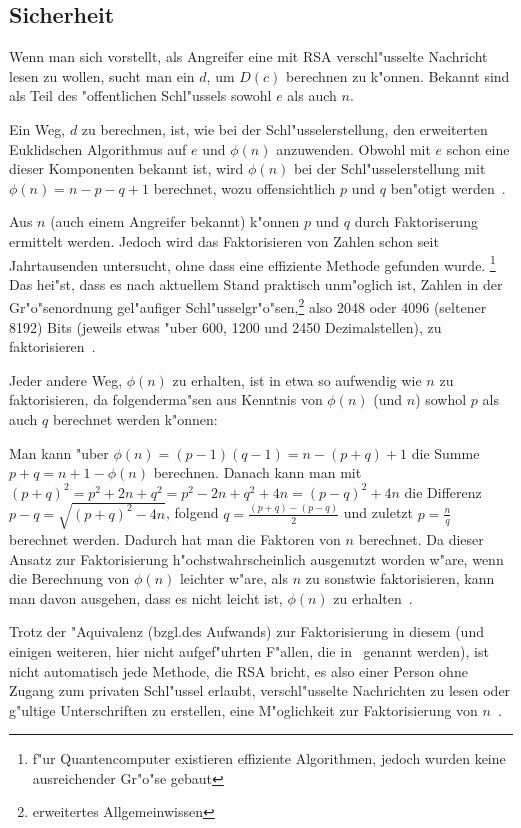 \documentclass[12pt]{article}
\begin{document}
\subsection{Sicherheit}
\label{subsec:math:security}

Wenn man sich vorstellt, als Angreifer eine mit RSA verschl"usselte Nachricht
lesen zu wollen, sucht man ein $d$, um $D(c)$ berechnen zu k"onnen.
Bekannt sind als Teil des "offentlichen Schl"ussels sowohl $e$ als auch $n$.

Ein Weg, $d$ zu berechnen, ist, wie bei der Schl"usselerstellung,
den erweiterten Euklidschen Algorithmus auf $e$ und $\phi(n)$ anzuwenden.
Obwohl mit $e$ schon eine dieser Komponenten bekannt ist, wird $\phi(n)$
bei der Schl"usselerstellung mit $\phi(n) = n - p - q + 1$ berechnet,
wozu offensichtlich $p$ und $q$ ben"otigt werden~\cite{rsa}.

Aus $n$ (auch einem Angreifer bekannt) k"onnen $p$ und $q$ durch Faktoriserung ermittelt werden.
Jedoch wird das Faktorisieren von Zahlen schon seit Jahrtausenden untersucht,
ohne dass eine effiziente Methode gefunden wurde.%
\footnote{f"ur Quantencomputer existieren effiziente Algorithmen,
jedoch wurden keine ausreichender Gr"o"se gebaut}
Das hei"st, dass es nach aktuellem Stand praktisch unm"oglich ist,
Zahlen in der Gr"o"senordnung gel"aufiger Schl"usselgr"o"sen,\footnote{erweitertes Allgemeinwissen}
also 2048 oder 4096 (seltener 8192) Bits (jeweils etwas "uber 600, 1200 und 2450 Dezimalstellen),
zu faktorisieren~\cite{sinews}.

Jeder andere Weg, $\phi(n)$ zu erhalten, ist in etwa so aufwendig wie $n$ zu faktorisieren,
da folgenderma"sen aus Kenntnis von $\phi(n)$ (und $n$) sowhol $p$ als auch $q$ berechnet werden k"onnen:

Man kann "uber $\phi(n) = (p-1)(q-1) = n - (p+q) + 1$ die Summe $p+q = n + 1 - \phi(n)$ berechnen.
Danach kann man mit $(p+q)^2 = p^2 + 2n + q^2 = p^2 - 2n + q^2 + 4n = (p-q)^2 + 4n$
die Differenz $p-q = \sqrt{(p+q)^2 - 4n}$, folgend $q = \frac{(p+q) - (p-q)}{2}$
und zuletzt $p = \frac{n}{q}$ berechnet werden.
Dadurch hat man die Faktoren von $n$ berechnet.
Da dieser Ansatz zur Faktorisierung h"ochstwahrscheinlich ausgenutzt worden w"are,
wenn die Berechnung von $\phi(n)$ leichter w"are, als $n$ zu sonstwie faktorisieren,
kann man davon ausgehen, dass es nicht leicht ist, $\phi(n)$ zu erhalten~\cite{rsa}.

Trotz der "Aquivalenz (bzgl.\@ des Aufwands) zur Faktorisierung in diesem (und einigen weiteren,
hier nicht aufgef"uhrten F"allen, die in~\cite{rsa} genannt werden),
ist nicht automatisch jede Methode, die RSA bricht,
es also einer Person ohne Zugang zum privaten Schl"ussel erlaubt,
verschl"usselte Nachrichten zu lesen oder g"ultige Unterschriften zu erstellen,
eine M"oglichkeit zur Faktorisierung von $n$~\cite{sinews}.
\end{document}
